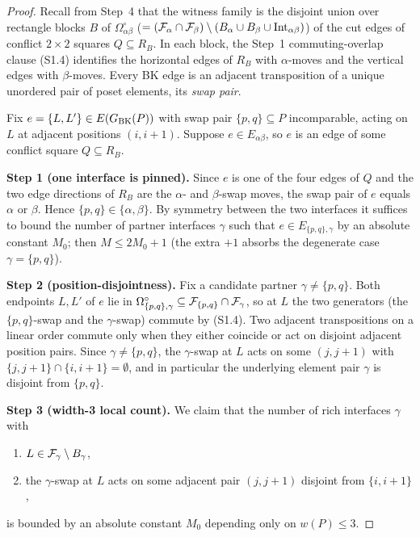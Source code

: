 \begin{proof}
Recall from Step~4 that the witness family is the disjoint union over
rectangle blocks $B$ of $\Omega^\circ_{\alpha\beta}$
($=(\mathcal{F}_{\alpha}\cap\mathcal{F}_{\beta})\setminus(B_\alpha\cup B_\beta\cup
\mathrm{Int}_{\alpha\beta})$) of the cut edges of conflict
$2\times 2$ squares $Q\subseteq R_B$.  In each block, the Step~1
commuting-overlap clause (S1.4) identifies the horizontal edges of
$R_B$ with $\alpha$-moves and the vertical edges with $\beta$-moves.
Every BK edge is an adjacent transposition of a unique unordered pair
of poset elements, its \emph{swap pair}.

Fix $e=\{L,L'\}\in E(G_{\mathrm{BK}}(P))$ with swap pair
$\{p,q\}\subseteq P$ incomparable, acting on $L$ at adjacent positions
$(i,i+1)$.  Suppose $e\in E_{\alpha\beta}$, so $e$ is an edge of some
conflict square $Q\subseteq R_B$.

\smallskip\noindent\textbf{Step 1 (one interface is pinned).}
Since $e$ is one of the four edges of $Q$ and the two edge directions
of $R_B$ are the $\alpha$- and $\beta$-swap moves, the swap pair of
$e$ equals $\alpha$ or $\beta$.  Hence $\{p,q\}\in\{\alpha,\beta\}$.
By symmetry between the two interfaces it suffices to bound the
number of partner interfaces $\gamma$ such that
$e\in E_{\{p,q\},\gamma}$ by an absolute constant $M_0$; then
$M\le 2M_0+1$ (the extra $+1$ absorbs the degenerate case
$\gamma=\{p,q\}$).

\smallskip\noindent\textbf{Step 2 (position-disjointness).}
Fix a candidate partner $\gamma\ne\{p,q\}$.  Both endpoints
$L,L'$ of $e$ lie in $\Omega^\circ_{\{p,q\},\gamma}\subseteq
\mathcal{F}_{\{p,q\}}\cap\mathcal{F}_{\gamma}$, so at $L$ the two generators
(the $\{p,q\}$-swap and the $\gamma$-swap) commute by (S1.4).  Two
adjacent transpositions on a linear order commute only when they
either coincide or act on disjoint adjacent position pairs.  Since
$\gamma\ne\{p,q\}$, the $\gamma$-swap at $L$ acts on some
$(j,j+1)$ with $\{j,j+1\}\cap\{i,i+1\}=\emptyset$, and in particular
the underlying element pair $\gamma$ is disjoint from $\{p,q\}$.

\smallskip\noindent\textbf{Step 3 (width-3 local count).}
We claim that the number of rich interfaces $\gamma$ with
\begin{enumerate}[label=\textup{(\roman*)},nosep]
  \item $L\in\mathcal{F}_{\gamma}\setminus B_\gamma$,
  \item the $\gamma$-swap at $L$ acts on some adjacent pair
  $(j,j+1)$ disjoint from $\{i,i+1\}$,
\end{enumerate}
is bounded by an absolute constant $M_0$ depending only on
$w(P)\le 3$.


\end{proof}
